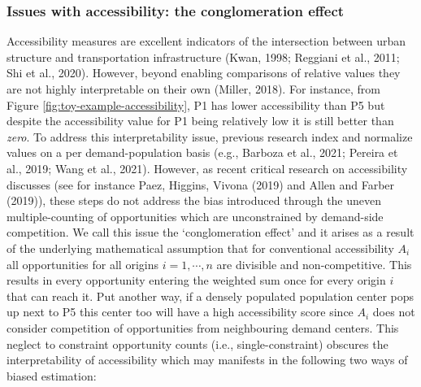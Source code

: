 \documentclass[]{elsarticle} %
\begin{document}
\hypertarget{issues-with-accessibility-the-conglomeration-effect}{%
\subsubsection{Issues with accessibility: the conglomeration
effect}\label{issues-with-accessibility-the-conglomeration-effect}}

Accessibility measures are excellent indicators of the intersection
between urban structure and transportation infrastructure (Kwan, 1998;
Reggiani et al., 2011; Shi et al., 2020). However, beyond enabling
comparisons of relative values they are not highly interpretable on
their own (Miller, 2018). For instance, from Figure
\ref{fig:toy-example-accessibility}, P1 has lower accessibility than P5
but despite the accessibility value for P1 being relatively low it is
still better than \emph{zero}. To address this interpretability issue,
previous research index and normalize values on a per demand-population
basis (e.g., Barboza et al., 2021; Pereira et al., 2019; Wang et al.,
2021). However, as recent critical research on accessibility discusses
(see for instance Paez, Higgins, Vivona (2019) and Allen and Farber
(2019)), these steps do not address the bias introduced through the
uneven multiple-counting of opportunities which are unconstrained by
demand-side competition. We call this issue the `conglomeration effect'
and it arises as a result of the underlying mathematical assumption that
for conventional accessibility \(A_i\) all opportunities for all origins
\(i=1,\cdots,n\) are divisible and non-competitive. This results in
every opportunity entering the weighted sum once for every origin \(i\)
that can reach it. Put another way, if a densely populated population
center pops up next to P5 this center too will have a high accessibility
score since \(A_i\) does not consider competition of opportunities from
neighbouring demand centers. This neglect to constraint opportunity
counts (i.e., single-constraint) obscures the interpretability of
accessibility which may manifests in the following two ways of biased
estimation:
\end{document}
